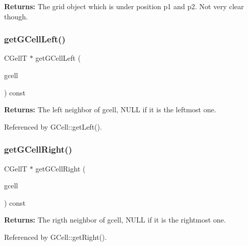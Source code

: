 {\bfseries Returns\+:} The grid object which is under position {\ttfamily p1} and {\ttfamily p2}. Not very clear though. \mbox{\label{classKatabatic_1_1Grid_ae5041816e75468b69bb0bbf24a4e8eca}} 
\subsubsection{\texorpdfstring{get\+G\+Cell\+Left()}{getGCellLeft()}}
{\footnotesize\ttfamily C\+GellT $\ast$ get\+G\+Cell\+Left (\begin{DoxyParamCaption}\item[{const G\+CellT $\ast$}]{gcell }\end{DoxyParamCaption}) const\hspace{0.3cm}{\ttfamily [inline]}}

{\bfseries Returns\+:} The left neighbor of {\ttfamily gcell}, {\ttfamily N\+U\+LL} if it is the leftmost one. 

Referenced by G\+Cell\+::get\+Left().

\mbox{\label{classKatabatic_1_1Grid_a0e9bba0feb437dca932d59703298358e}} 
\subsubsection{\texorpdfstring{get\+G\+Cell\+Right()}{getGCellRight()}}
{\footnotesize\ttfamily C\+GellT $\ast$ get\+G\+Cell\+Right (\begin{DoxyParamCaption}\item[{const G\+CellT $\ast$}]{gcell }\end{DoxyParamCaption}) const\hspace{0.3cm}{\ttfamily [inline]}}

{\bfseries Returns\+:} The rigth neighbor of {\ttfamily gcell}, {\ttfamily N\+U\+LL} if it is the rightmost one. 

Referenced by G\+Cell\+::get\+Right().

\mbox{\label{classKatabatic_1_1Grid_a3a22f2bce9124765eb937b78c90059a0}} 
